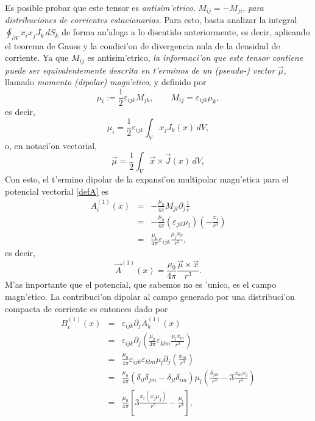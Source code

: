 Es posible probar que este tensor es \textit{antisim'etrico},
$M_{ij}=-M_{ji}$, \textit{para distribuciones de corrientes estacionarias}. Para esto,
basta analizar la integral $\oint_{\partial V}x_i x_j J_k\,dS_k$ de forma
an'aloga a lo discutido anteriormente, es decir, aplicando el teorema de Gauss y la
condici'on de divergencia nula de la densidad de corriente. Ya que $M_{ij}$ es
antisim'etrico, \textit{la informaci'on que este tensor contiene puede ser
equivalentemente descrita en t'erminos de un (pseudo-) vector} $\vec{\mu}$,
llamado \textit{momento (dipolar) magn'etico}, y definido por
\begin{equation}
 \mu_i:=\frac{1}{2}\varepsilon_{ijk}M_{jk}, \qquad
M_{ij}=\varepsilon_{ijk}\mu_k, \label{vmdm}
\end{equation}
es decir,
\begin{equation}
 \boxed{\mu_i=\frac{1}{2}\varepsilon_{ijk}\int_V x_j J_k(x)\, dV,}
\end{equation}
o, en notaci'on vectorial, 
\begin{equation}
 \boxed{\vec{\mu}=\frac{1}{2}\int_V \vec{x}\times\vec{J}(x)\,dV,}
\end{equation}
Con esto, el t'ermino dipolar de la expansi'on multipolar magn'etica para el
potencial vectorial \eqref{defA} es
\begin{eqnarray}
 A_i^{(1)}(x)&=&-\frac{\mu_0}{4\pi}M_{ji}\partial_j\frac{1}{r} \\
&=&-\frac{\mu_0}{4\pi}\left(\varepsilon_{jil}\mu_l\right)\left(-\frac{x_j}{
r^3}\right) \\
&=&\frac{\mu_0}{4\pi}\varepsilon_{ijk}\frac{\mu_jx_k}{r^3},
\end{eqnarray}
es decir,
\begin{equation}
 \boxed{\vec{A}^{(1)}(x)=\frac{\mu_0}{4\pi}\frac{\vec{\mu}\times\vec{x}}{r^3}.}
\label{Adip}
\end{equation}
M'as importante que el potencial, que sabemos no es 'unico, es el campo
magn'etico. La contribuci'on dipolar al campo generado por una distribuci'on
compacta de corriente es entonces dado por
\begin{eqnarray}
B_i^{(1)}(x)&=&\varepsilon_{ijk}\partial_jA_k^{(1)}(x)\\
&=&\varepsilon_{ijk}\partial_j\left(\frac{\mu_0}{4\pi}\varepsilon_{klm}\frac{
\mu_lx_m}{r^3}\right) \\
&=&\frac{\mu_0}{4\pi}\varepsilon_{ijk}\varepsilon_{klm}\mu_l\partial_j\left(
\frac{x_m}{r^3}\right) \\
&=&\frac{\mu_0}{4\pi}\left(\delta_{il}\delta_{jm}-\delta_{jl}\delta_{im}\right)
\mu_l\left(\frac{\delta_{jm}}{r^3}-3\frac{x_mx_j}{r^5}\right) \\
&=&\frac{\mu_0}{4\pi}\left[3\frac{x_i(x_j\mu_j)}{r^5}-\frac{\mu_i}{r^3}
\right] ,
\end{eqnarray}
